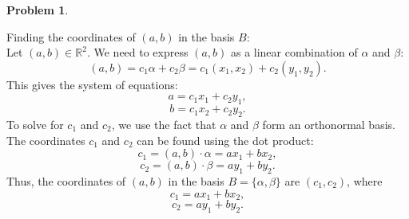 \documentclass[12pt]{article}
\theoremstyle{definition}
\newtheorem{problem}{Problem}
\begin{document}
\begin{problem}
\begin{solution}
        Finding the coordinates of \( (a, b) \) in the basis \( B \):\\
        Let \( (a, b) \in \mathbb{R}^2 \). We need to express \( (a, b) \) as a linear combination of \( \alpha \) and \( \beta \):
        \[(a, b) = c_1 \alpha + c_2 \beta = c_1 (x_1, x_2) + c_2 (y_1, y_2).\]
        This gives the system of equations:
        \[a = c_1 x_1 + c_2 y_1,\]
        \[b = c_1 x_2 + c_2 y_2.\]
        To solve for \( c_1 \) and \( c_2 \), we use the fact that \( \alpha \) and \( \beta \) form an orthonormal basis. The coordinates \( c_1 \) and \( c_2 \) can be found using the dot product:
        \[c_1 = (a, b) \cdot \alpha = a x_1 + b x_2,\]
        \[c_2 = (a, b) \cdot \beta = a y_1 + b y_2.\]
        Thus, the coordinates of \( (a, b) \) in the basis \( B = \{\alpha, \beta\} \) are \( (c_1, c_2) \), where
        \[    c_1 = a x_1 + b x_2,    \]
        \[    c_2 = a y_1 + b y_2.    \]
    \end{solution}

\end{problem}
\end{document}
